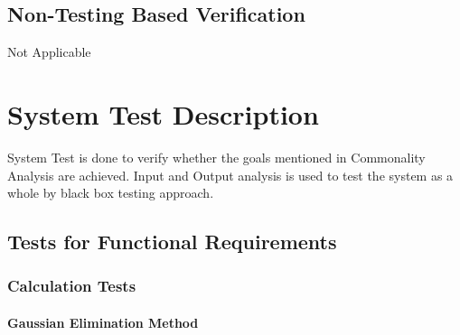 \documentclass[12pt, titlepage]{article}
\begin{document}
\subsection{Non-Testing Based Verification}
		
Not Applicable

\section{System Test Description}

System Test is done to verify whether the goals mentioned in Commonality
Analysis are achieved. Input and Output analysis is used to test the system as a
whole by black box testing approach.
	
\subsection{Tests for Functional Requirements}

\subsubsection{Calculation Tests}
		
\paragraph{Gaussian Elimination Method }
\end{document}
